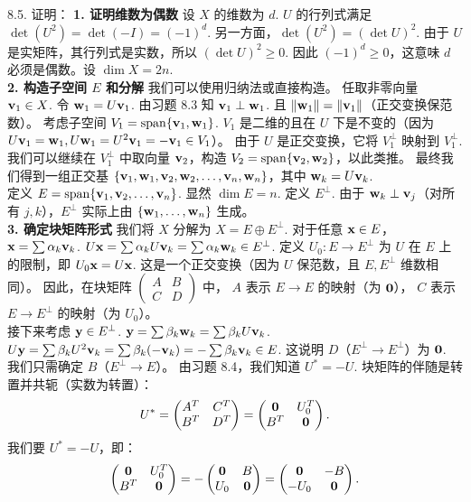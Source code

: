 \begin{exer}
8.5. 证明：
\textbf{1. 证明维数为偶数}
设 $X$ 的维数为 $d$.
$U$ 的行列式满足 $\det(U^2) = \det(-I) = (-1)^d$.
另一方面，$\det(U^2) = (\det U)^2$. 由于 $U$ 是实矩阵，其行列式是实数，所以 $(\det U)^2 \ge 0$.
因此 $(-1)^d \ge 0$，这意味 $d$ 必须是偶数。设 $\dim X = 2n$.
\\
\textbf{2. 构造子空间 $E$ 和分解}
我们可以使用归纳法或直接构造。
任取非零向量 $\mathbf{v}_1 \in X$. 令 $\mathbf{w}_1 = U\mathbf{v}_1$.
由习题 8.3 知 $\mathbf{v}_1 \perp \mathbf{w}_1$. 且 $\|\mathbf{w}_1\| = \|\mathbf{v}_1\|$（正交变换保范数）。
考虑子空间 $V_1 = \operatorname{span}\{\mathbf{v}_1, \mathbf{w}_1\}$. $V_1$ 是二维的且在 $U$ 下是不变的（因为 $U\mathbf{v}_1 = \mathbf{w}_1, U\mathbf{w}_1 = U^2\mathbf{v}_1 = -\mathbf{v}_1 \in V_1$）。
由于 $U$ 是正交变换，它将 $V_1^\perp$ 映射到 $V_1^\perp$.
我们可以继续在 $V_1^\perp$ 中取向量 $\mathbf{v}_2$，构造 $V_2 = \operatorname{span}\{\mathbf{v}_2, \mathbf{w}_2\}$，以此类推。
最终我们得到一组正交基 $\{\mathbf{v}_1, \mathbf{w}_1, \mathbf{v}_2, \mathbf{w}_2, \dots, \mathbf{v}_n, \mathbf{w}_n\}$，其中 $\mathbf{w}_k = U\mathbf{v}_k$.
\\
定义 $E = \operatorname{span}\{\mathbf{v}_1, \mathbf{v}_2, \dots, \mathbf{v}_n\}$.
显然 $\dim E = n$.
定义 $E^\perp$. 由于 $\mathbf{w}_k \perp \mathbf{v}_j$（对所有 $j, k$），$E^\perp$ 实际上由 $\{\mathbf{w}_1, \dots, \mathbf{w}_n\}$ 生成。
\\
\textbf{3. 确定块矩阵形式}
我们将 $X$ 分解为 $X = E \oplus E^\perp$.
对于任意 $\mathbf{x} \in E$，$\mathbf{x} = \sum \alpha_k \mathbf{v}_k$.
$U\mathbf{x} = \sum \alpha_k U\mathbf{v}_k = \sum \alpha_k \mathbf{w}_k \in E^\perp$.
定义 $U_0: E \to E^\perp$ 为 $U$ 在 $E$ 上的限制，即 $U_0 \mathbf{x} = U\mathbf{x}$.
这是一个正交变换（因为 $U$ 保范数，且 $E, E^\perp$ 维数相同）。
因此，在块矩阵 $\begin{pmatrix} A & B \\ C & D \end{pmatrix}$ 中，
$A$ 表示 $E \to E$ 的映射（为 $\mathbf{0}$），
$C$ 表示 $E \to E^\perp$ 的映射（为 $U_0$）。
\\
接下来考虑 $\mathbf{y} \in E^\perp$. $\mathbf{y} = \sum \beta_k \mathbf{w}_k = \sum \beta_k U\mathbf{v}_k$.
$U\mathbf{y} = \sum \beta_k U^2 \mathbf{v}_k = \sum \beta_k (-\mathbf{v}_k) = -\sum \beta_k \mathbf{v}_k \in E$.
这说明 $D$（$E^\perp \to E^\perp$）为 $\mathbf{0}$.
我们只需确定 $B$（$E^\perp \to E$）。
由习题 8.4，我们知道 $U^* = -U$.
块矩阵的伴随是转置并共轭（实数为转置）：
$$ U^* = \begin{pmatrix} A^T & C^T \\ B^T & D^T \end{pmatrix} = \begin{pmatrix} \mathbf{0} & U_0^T \\ B^T & \mathbf{0} \end{pmatrix}. $$
我们要 $U^* = -U$，即：
$$ \begin{pmatrix} \mathbf{0} & U_0^T \\ B^T & \mathbf{0} \end{pmatrix} = - \begin{pmatrix} \mathbf{0} & B \\ U_0 & \mathbf{0} \end{pmatrix} = \begin{pmatrix} \mathbf{0} & -B \\ -U_0 & \mathbf{0} \end{pmatrix}. $$

\end{exer}
